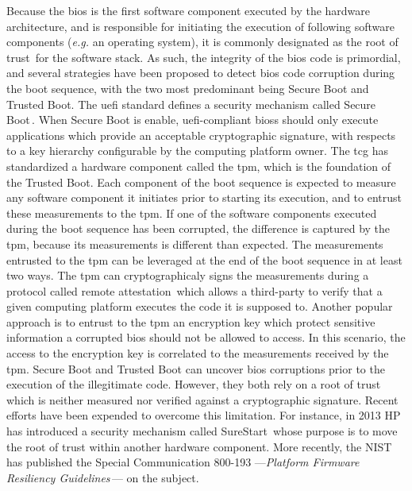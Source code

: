 Because the \ac{bios} is the first software component executed by the hardware
architecture, and is responsible for initiating the execution of following
software components (\emph{e.g.} an operating system), it is commonly designated
as the root of trust\,\cite{rutkowska2015intel} for the software stack.
%
As such, the integrity of the \ac{bios} code is primordial, and several
strategies have been proposed to detect \ac{bios} code corruption during the
boot sequence, with the two most predominant being Secure Boot and Trusted Boot.
%
The \ac{uefi} standard defines a security mechanism called Secure
Boot\,\cite{rosenbaum2012secboot}.
%
When Secure Boot is enable, \ac{uefi}-compliant \acp{bios} should only execute
applications which provide an acceptable cryptographic signature, with respects
to a key hierarchy configurable by the computing platform owner.
%
The \ac{tcg} has standardized a hardware component called the \ac{tpm}, which is
the foundation of the Trusted Boot.
%
Each component of the boot sequence is expected to measure any software
component it initiates prior to starting its execution, and to entrust these
measurements to the \ac{tpm}.
%
If one of the software components executed during the boot sequence has been
corrupted, the difference is captured by the \ac{tpm}, because its measurements
is different than expected.
%
The measurements entrusted to the \ac{tpm} can be leveraged at the end of the
boot sequence in at least two ways.
%
The \ac{tpm} can cryptographicaly signs the measurements during a protocol
called remote attestation\,\cite{coker2011remoteattestation} which allows a
third-party to verify that a given computing platform executes the code it is
supposed to.
%
Another popular approach is to entrust to the \ac{tpm} an encryption key which
protect sensitive information a corrupted \ac{bios} should not be allowed to
access.
%
In this scenario, the access to the encryption key is correlated to the
measurements received by the \ac{tpm}.
%
Secure Boot and Trusted Boot can uncover \ac{bios} corruptions prior to the
execution of the illegitimate code.
%
However, they both rely on a root of trust which is neither measured nor
verified against a cryptographic signature.
%
Recent efforts have been expended to overcome this limitation.
%
For instance, in 2013 HP has introduced a security mechanism called
SureStart\,\cite{hp2016surestart} whose purpose is to move the root of trust
within another hardware component.
%
More recently, the NIST has published the Special Communication 800-193
---\emph{Platform Firmware Resiliency
  Guidelines}\,\cite{regenscheid2018nist800193}--- on the subject.

